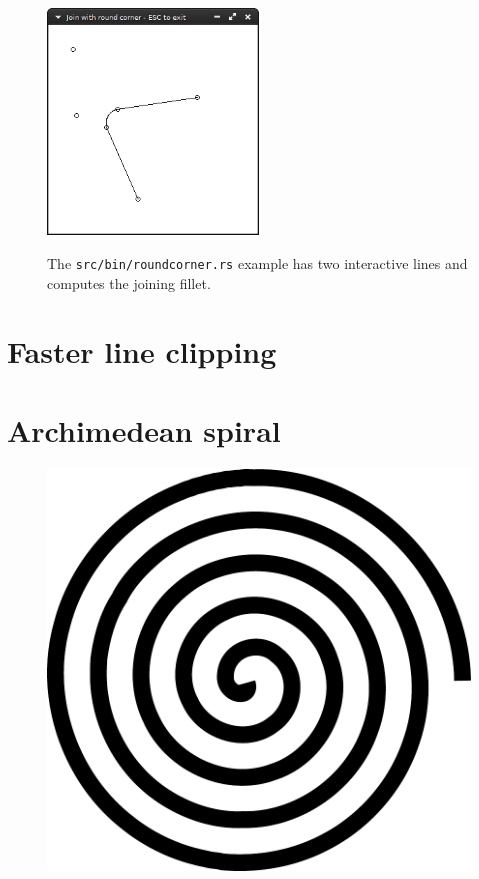 \documentclass[12pt,openany,a4,usenames,dvipsnames]{book}
\DeclareRobustCommand{\Caption}[1]{\par%
  \vspace{1em}
  {\noindent{}#1}}
\begin{document}
\begin{figure}[H]
  \centering{}
  \includegraphics[width=0.5\textwidth,keepaspectratio]{figures/roundcorner1.png}
  \Caption{The \texttt{src/bin/roundcorner.rs} example has two interactive lines and computes the joining fillet.}
\end{figure}
%
%
%
\chapter{Faster line clipping}
\skelpar%
%
%
%
\chapter{Archimedean spiral}
\begin{figure}[H]
  \centering
  \includegraphics[height=12\baselineskip,keepaspectratio]{figures/archspiral.pdf}
\end{figure}
\end{document}

